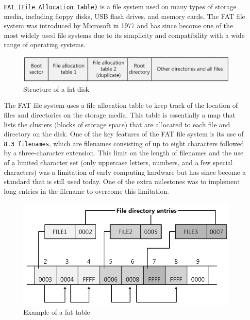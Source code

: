 \href{https://en.wikipedia.org/wiki/File_Allocation_Table}{\texttt{FAT (File Allocation Table)}} is a file system used on many types of storage media, including floppy disks, USB flash drives, and memory cards. The FAT file system was introduced by Microsoft in 1977 and has since become one of the most widely used file systems due to its simplicity and compatibility with a wide range of operating systems.

\begin{figure}[htp]
    \centering
    \includegraphics[width=12cm]{images/filesystem/fat_structure.jpg}
    \caption{Structure of a fat disk}
    \label{fig:galaxy}
\end{figure}


The FAT file system uses a file allocation table to keep track of the location of files and directories on the storage media. This table is essentially a map that lists the clusters (blocks of storage space) that are allocated to each file and directory on the disk.
One of the key features of the FAT file system is its use of \texttt{8.3 filenames}, which are filenames consisting of up to eight characters followed by a three-character extension. This limit on the length of filenames and the use of a limited character set (only uppercase letters, numbers, and a few special characters) was a limitation of early computing hardware but has since become a standard that is still used today. One of the extra milestones was to implement long entries in the filename to overcome this limitation.

\begin{figure}[htp]
    \centering
    \includegraphics[width=12cm]{images/filesystem/fat_example.png}
    \caption{Example of a fat table}
    \label{fig:galaxy}
\end{figure}


